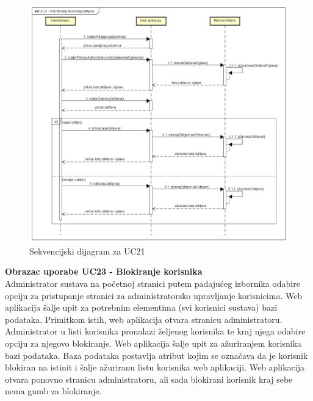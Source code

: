 				\begin{figure}[htb]
					\centering
					\includegraphics[width=14cm]{slike/Sekvencijski dijagram - UC21}
					\caption{Sekvencijski dijagram za UC21}
					\label{fig:Sekvencijski-UC21}
				\end{figure}
				\eject	
				
				\textbf{Obrazac uporabe UC23 - Blokiranje korisnika}\\
				
				Administrator sustava na početnoj stranici putem padajućeg izbornika odabire opciju za pristupanje stranici za administratorsko upravljanje korisnicima. Web aplikacija šalje upit za potrebnim elementima (svi korisnici sustava) bazi podataka. Primitkom istih, web aplikacija otvara stranicu administratoru. Administrator u listi korisnika pronalazi željenog korisnika te kraj njega odabire opciju za njegovo blokiranje. Web aplikacija šalje upit za ažuriranjem korisnika bazi podataka. Baza podataka postavlja atribut kojim se označava da je korisnik blokiran na istinit i šalje ažuriranu listu korisnika web aplikaciji.
				Web aplikacija otvara ponovno stranicu administratoru, ali sada blokirani korisnik kraj sebe nema gumb za blokiranje.
				
